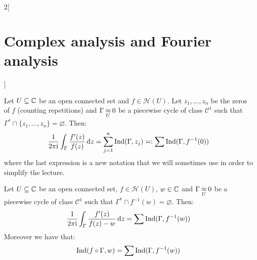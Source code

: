 \documentclass[../../../main.tex]{subfiles}
\begin{document}
\begin{multicols}{2}[\section{Complex analysis and Fourier analysis}]
  \begin{theorem}
    Let $U\subseteq\mathbb{C}$ be an open connected set and $f\in\mathcal{H}(U)$. Let $z_1,\ldots,z_n$ be the zeros of $f$ (counting repetitions) and $\Gamma\mathbin{\underset{U}{\approx}} 0$ be a piecewise cycle of class $\mathcal{C}^1$ such that $\Gamma^*\cap\{z_1,\ldots,z_n\}=\varnothing$. Then:
    $$\frac{1}{2\pi\mathrm{i}}\int_{\Gamma}\frac{f'(z)}{f(z)}\dd{z}=\sum_{j=1}^n\operatorname{Ind}(\Gamma,z_j)=:\sum\operatorname{Ind}(\Gamma,f^{-1}(0))$$
    where the last expression is a new notation that we will sometimes use in order to simplify the lecture.
  \end{theorem}
  \begin{corollary}
    Let $U\subseteq\mathbb{C}$ be an open connected set, $f\in\mathcal{H}(U)$, $w\in \mathbb{C}$ and $\Gamma\mathbin{\underset{U}{\approx}} 0$ be a piecewise cycle of class $\mathcal{C}^1$ such that $\Gamma^*\cap f^{-1}(w)=\varnothing$. Then:
    $$\frac{1}{2\pi\mathrm{i}}\int_{\Gamma}\frac{f'(z)}{f(z)-w}\dd{z}=\sum\operatorname{Ind}(\Gamma,f^{-1}(w))$$
    Moreover we have that:
    $$\operatorname{Ind}(f\circ\Gamma,w)=\sum\operatorname{Ind}(\Gamma,f^{-1}(w))$$
  \end{corollary}

\end{multicols}
\end{document}
